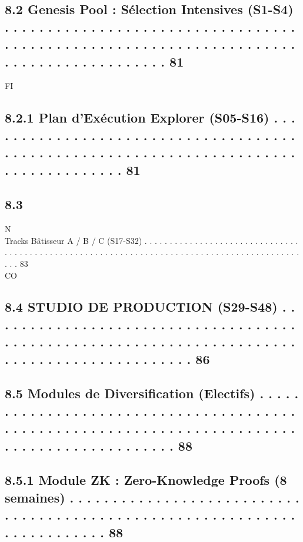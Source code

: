 \subsection{8.2     Genesis Pool : Sélection Intensives (S1-S4) . . . . . . . . . . . . . . . . . . . . . . . . . . . . . . . . . . . . . . . . . . . . . . . . . . . . . . . . . . . . . . . . . . . . . . . . . . . . . . . . . . . . . . . 81}
\vspace{0.5em}
\vspace{0.5em}
\vspace{0.5em}
\vspace{0.5em}
FI\\
\subsection{8.2.1              Plan d’Exécution Explorer (S05-S16) . . . . . . . . . . . . . . . . . . . . . . . . . . . . . . . . . . . . . . . . . . . . . . . . . . . . . . . . . . . . . . . . . . . . . . . . . . . . . . . . . . . . . 81}
\subsection{8.3}
N\\
Tracks Bâtisseur A / B / C (S17-S32) . . . . . . . . . . . . . . . . . . . . . . . . . . . . . . . . . . . . . . . . . . . . . . . . . . . . . . . . . . . . . . . . . . . . . . . . . . . . . . . . . . . . . . . . . . . . . 83\\
CO\\
\subsection{8.4     STUDIO DE PRODUCTION (S29-S48) . . . . . . . . . . . . . . . . . . . . . . . . . . . . . . . . . . . . . . . . . . . . . . . . . . . . . . . . . . . . . . . . . . . . . . . . . . . . . . . . . . . . . . . . . . . . 86}
\subsection{8.5     Modules de Diversification (Electifs) . . . . . . . . . . . . . . . . . . . . . . . . . . . . . . . . . . . . . . . . . . . . . . . . . . . . . . . . . . . . . . . . . . . . . . . . . . . . . . . . . . . . . . . . . . . . . 88}
\subsection{8.5.1              Module ZK : Zero-Knowledge Proofs (8 semaines) . . . . . . . . . . . . . . . . . . . . . . . . . . . . . . . . . . . . . . . . . . . . . . . . . . . . . . . . . . . . . . . . . . . . . . . . . 88}
